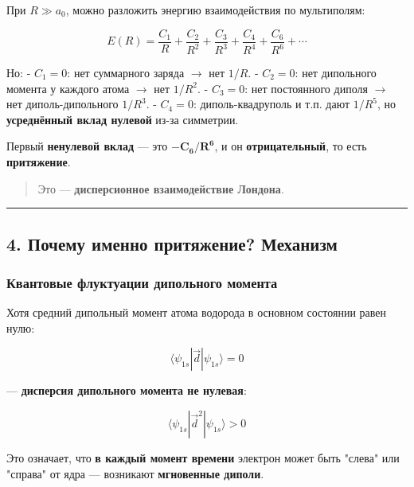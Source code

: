 \documentclass[11pt]{article}
\begin{document}
При \(R \gg a_0\), можно разложить энергию взаимодействия по
мультиполям:

\[
E(R) = \frac{C_1}{R} + \frac{C_2}{R^2} + \frac{C_3}{R^3} + \frac{C_4}{R^4} + \frac{C_6}{R^6} + \cdots
\]

Но: - \(C_1 = 0\): нет суммарного заряда $\rightarrow$ нет \(1/R\). -
\(C_2 = 0\): нет дипольного момента у каждого атома $\rightarrow$ нет
\(1/R^2\). - \(C_3 = 0\): нет постоянного диполя $\rightarrow$ нет
диполь-дипольного \(1/R^3\). - \(C_4 = 0\): диполь-квадруполь и т.п.
дают \(1/R^5\), но \textbf{усреднённый вклад нулевой} из-за симметрии.

Первый \textbf{ненулевой вклад} --- это \(\mathbf{-C_6 / R^6}\), и он
\textbf{отрицательный}, то есть \textbf{притяжение}.

\begin{quote}
Это --- \textbf{дисперсионное взаимодействие Лондона}.
\end{quote}

\begin{center}\rule{0.5\linewidth}{\linethickness}\end{center}

\subsection{4. Почему именно притяжение?
Механизм}\label{ux43fux43eux447ux435ux43cux443-ux438ux43cux435ux43dux43dux43e-ux43fux440ux438ux442ux44fux436ux435ux43dux438ux435-ux43cux435ux445ux430ux43dux438ux437ux43c}

\subsubsection{Квантовые флуктуации дипольного
момента}\label{ux43aux432ux430ux43dux442ux43eux432ux44bux435-ux444ux43bux443ux43aux442ux443ux430ux446ux438ux438-ux434ux438ux43fux43eux43bux44cux43dux43eux433ux43e-ux43cux43eux43cux435ux43dux442ux430}

Хотя средний дипольный момент атома водорода в основном состоянии равен
нулю:

\[
\langle \psi_{1s} | \vec{d} | \psi_{1s} \rangle = 0
\]

--- \textbf{дисперсия дипольного момента не нулевая}:

\[
\langle \psi_{1s} | \vec{d}^2 | \psi_{1s} \rangle > 0
\]

Это означает, что \textbf{в каждый момент времени} электрон может быть
"слева" или "справа" от ядра --- возникают \textbf{мгновенные диполи}.
\end{document}
